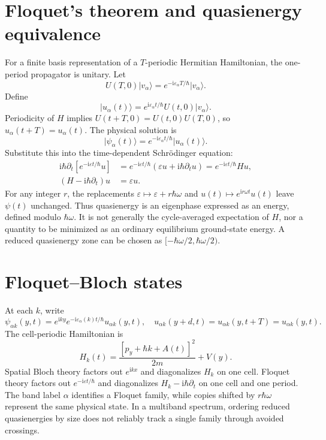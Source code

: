 \documentclass[11pt,oneside]{report}
\numberwithin{equation}{chapter}
\newcommand{\ii}{\mathrm i}
\newcommand{\ket}[1]{\lvert #1\rangle}
\begin{document}
\section{Floquet's theorem and quasienergy equivalence}
For a finite basis representation of a $T$-periodic Hermitian Hamiltonian, the one-period propagator is unitary. Let
\begin{equation}
 U(T,0)\ket{v_\alpha}=e^{-\ii\varepsilon_\alpha T/\hbar}\ket{v_\alpha}.
\end{equation}
Define
\begin{equation}
 \ket{u_\alpha(t)}=e^{\ii\varepsilon_\alpha t/\hbar}U(t,0)\ket{v_\alpha}.
\end{equation}
Periodicity of $H$ implies $U(t+T,0)=U(t,0)U(T,0)$, so $u_\alpha(t+T)=u_\alpha(t)$. The physical solution is
\begin{equation}\label{eq:floquet}
 \ket{\psi_\alpha(t)}=e^{-\ii\varepsilon_\alpha t/\hbar}\ket{u_\alpha(t)}.
\end{equation}
Substitute this into the time-dependent Schr\"odinger equation:
\begin{align}
 \ii\hbar\partial_t[e^{-\ii\varepsilon t/\hbar}u]
 &=e^{-\ii\varepsilon t/\hbar}(\varepsilon u+\ii\hbar\partial_tu)=e^{-\ii\varepsilon t/\hbar}Hu,\\
 (H-\ii\hbar\partial_t)u&=\varepsilon u.\label{eq:Sambe}
\end{align}
For any integer $r$, the replacements $\varepsilon\mapsto\varepsilon+r\hbar\omega$ and $u(t)\mapsto e^{\ii r\omega t}u(t)$ leave $\psi(t)$ unchanged. Thus quasienergy is an eigenphase expressed as an energy, defined modulo $\hbar\omega$. It is not generally the cycle-averaged expectation of $H$, nor a quantity to be minimized as an ordinary equilibrium ground-state energy. A reduced quasienergy zone can be chosen as $[-\hbar\omega/2,\hbar\omega/2)$.

\section{Floquet--Bloch states}
At each $k$, write
\begin{equation}
 \psi_{\alpha k}(y,t)=e^{\ii ky}e^{-\ii\varepsilon_\alpha(k)t/\hbar}u_{\alpha k}(y,t),\quad
 u_{\alpha k}(y+d,t)=u_{\alpha k}(y,t+T)=u_{\alpha k}(y,t).
\end{equation}
The cell-periodic Hamiltonian is
\begin{equation}\label{eq:Hk}
 H_k(t)=\frac{[p_y+\hbar k+A(t)]^2}{2m}+V(y).
\end{equation}
Spatial Bloch theory factors out $e^{\ii kx}$ and diagonalizes $H_k$ on one cell. Floquet theory factors out $e^{-\ii\varepsilon t/\hbar}$ and diagonalizes $H_k-\ii\hbar\partial_t$ on one cell and one period. The band label $\alpha$ identifies a Floquet family, while copies shifted by $r\hbar\omega$ represent the same physical state. In a multiband spectrum, ordering reduced quasienergies by size does not reliably track a single family through avoided crossings.
\end{document}
